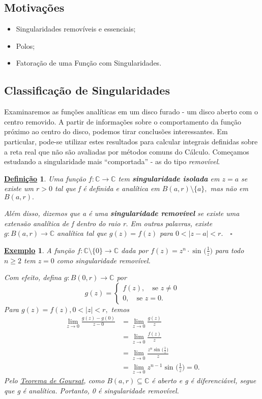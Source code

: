 \documentclass{article}
\newtheorem*{def*}{\underline{Defini\c c\~ao}}
\newtheorem{example}{\underline{Exemplo}}[section]
\begin{document}
  \subsection{Motivações} 
  \begin{itemize}
    \item Singularidades removíveis e essenciais;
    \item Polos;
    \item Fatoração de uma Função com Singularidades.
  \end{itemize}
  \subsection{Classificação de Singularidades}
  Examinaremos as funções analíticas em um disco furado - um disco aberto com o centro removido. A partir de informações sobre 
  o comportamento da função próximo ao centro do disco, podemos tirar conclusões interessantes. Em particular, pode-se utilizar estes resultados
  para calcular integrais definidas sobre a reta real que não são avaliadas por métodos comuns do Cálculo.
  Começamos estudando a singularidade mais ``comportada'' - as do tipo \textit{removível}.
  \begin{def*}
    Uma função \(f:\mathbb{C}\rightarrow \mathbb{C}\) tem \textbf{singularidade isolada} em \(z = a\) se existe um \(r > 0\)
    tal que f é definida e analítica em \(B(a, r)\setminus{\{a\}},\) mas não em \(B(a, r).\)

    Além disso, dizemos que a é uma \textbf{singularidade removível} se existe uma extensão analítica de f dentro do raio r.
    Em outras palavras, existe \(g:B(a, r)\rightarrow \mathbb{C}\) analítica tal que \(g(z) = f(z)\) para \(0 < |z-a| < r.\quad \square\)
  \end{def*}
  \begin{example}
    A função \(f:\mathbb{C}\setminus{\{0\}}\rightarrow \mathbb{C}\) dada por \(f(z) = z^{n}\cdot \sin^{}{\biggl(\frac{1}{z}\biggr)}\) para todo \(n \geq 2\) tem
    \(z=0\) como singularidade removível. 

    Com efeito, defina \(g:B(0, r)\rightarrow \mathbb{C}\) por 
    \[
      g(z) = \left\{\begin{array}{ll}
          f(z),\quad \text{se }z\neq 0\\
          0,\quad \text{se } z = 0.
      \end{array}\right.
    \]
    Para \(g(z) = f(z), 0 < |z| < r,\) temos 
    \begin{align*}
      \lim_{z\to 0}\frac{g(z)-g(0)}{z-0} &= \lim_{z\to 0}\frac{g(z)}{z} \\
                                         &= \lim_{z\to 0}\frac{f(z)}{z} \\
                                         &= \lim_{z\to 0}\frac{z^{n}\sin^{}{\biggl(\frac{1}{z}\biggr)}}{z} \\
                                         &= \lim_{z\to 0} z^{n-1}\sin^{}{\biggl(\frac{1}{z}\biggr)} = 0.
    \end{align*}
    Pelo \hyperlink{goursat}{Teorema de Goursat}, como \(B(a, r)\subseteq \mathbb{C}\) é aberto e g é diferenciável, segue que g é analítica.
    Portanto, 0 é singularidade removível.
  \end{example}
\end{document}
